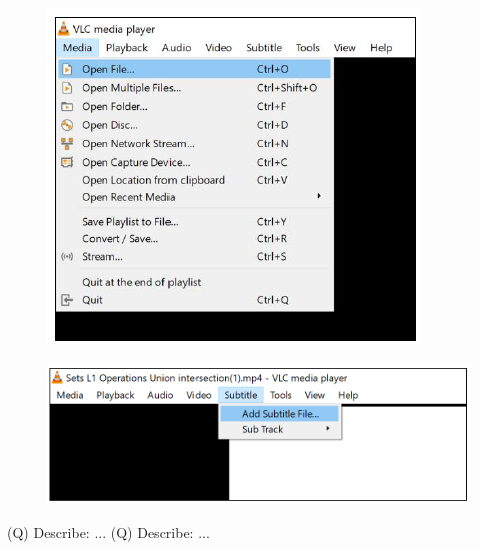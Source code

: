 \documentclass[12pt]{article}
\begin{document}
\begin{figure}[H]
\includegraphics[width=0.5\linewidth]{page10-image-3.png}
\end{figure}
\begin{figure}[H]
\includegraphics[width=0.5\linewidth]{page10-image-4.png}
\end{figure}
\clearpage
(Q)
Describe: ...
\clearpage
\clearpage
(Q)
Describe: ...
\clearpage
\\
\end{document}
